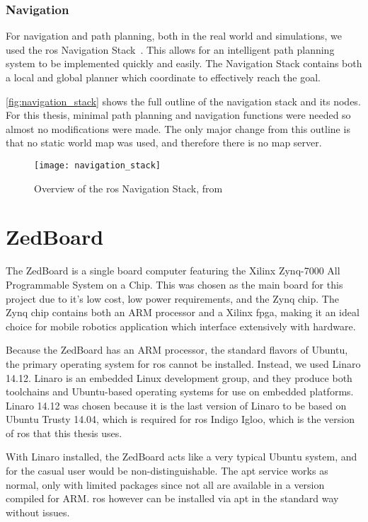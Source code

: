 \documentclass[thesis.tex]{subfile}
\begin{document}
\subsubsection{Navigation}
For navigation and path planning, both in the real world and simulations, we used the \gls{ros} Navigation Stack~\cite{ros_navigation}. This allows for an intelligent path planning system to be implemented quickly and easily. The Navigation Stack contains both a local and global planner which coordinate to effectively reach the goal. 

\autoref{fig:navigation_stack} shows the full outline of the navigation stack and its nodes. For this thesis, minimal path planning and navigation functions were needed so almost no modifications were made. The only major change from this outline is that no static world map was used, and therefore there is no map server.

\begin{figure}
\texttt{[image: navigation\_stack]}
\caption[Overview of the \gls{ros} Navigation Stack]{Overview of the \gls{ros} Navigation Stack, from~\cite{NavigationStack}}
\label{fig:navigation_stack}
\end{figure}

\section{ZedBoard}
The ZedBoard is a single board computer featuring the Xilinx Zynq-7000 All Programmable System on a Chip. This was chosen as the main board for this project due to it's low cost, low power requirements, and the Zynq chip. The Zynq chip contains both an ARM processor and a Xilinx \gls{fpga}, making it an ideal choice for mobile robotics application which interface extensively with hardware.
 
Because the ZedBoard has an ARM processor, the standard flavors of Ubuntu, the primary operating system for \gls{ros} cannot be installed. Instead, we used Linaro 14.12. Linaro is an embedded Linux development group, and they produce both toolchains and Ubuntu-based operating systems for use on embedded platforms. Linaro 14.12 was chosen because it is the last version of Linaro to be based on Ubuntu Trusty 14.04, which is required for \gls{ros} Indigo Igloo, which is the version of \gls{ros} that this thesis uses.

With Linaro installed, the ZedBoard acts like a very typical Ubuntu system, and for the casual user would be non-distinguishable. The apt service works as normal, only with limited packages since not all are available in a version compiled for ARM. \gls{ros} however can be installed via apt in the standard way without issues.
\end{document}
